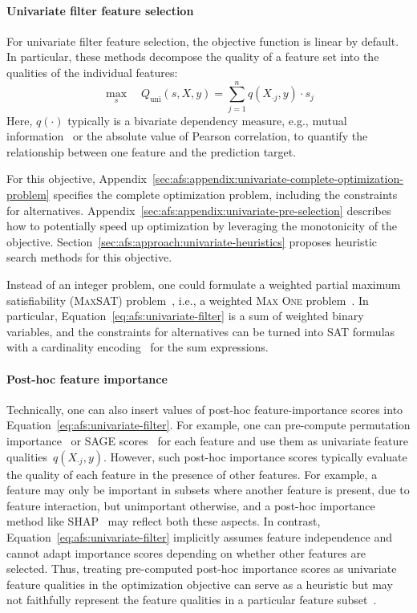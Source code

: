 \documentclass{article}
\theoremstyle{definition}
\begin{document}
\paragraph{Univariate filter feature selection}

For univariate filter feature selection, the objective function is linear by default.
In particular, these methods decompose the quality of a feature set into the qualities of the individual features:
%
\begin{equation}
	\max_s \quad Q_{\text{uni}}(s,X,y) = \sum_{j=1}^{n} q(X_{\cdot{}j},y) \cdot s_j
	\label{eq:afs:univariate-filter}
\end{equation}
%
Here, $q(\cdot)$ typically is a bivariate dependency measure, e.g., mutual information~\cite{kraskov2004estimating} or the absolute value of Pearson correlation, to quantify the relationship between one feature and the prediction target.

For this objective, Appendix~\ref{sec:afs:appendix:univariate-complete-optimization-problem} specifies the complete optimization problem, including the constraints for alternatives.
Appendix~\ref{sec:afs:appendix:univariate-pre-selection} describes how to potentially speed up optimization by leveraging the monotonicity of the objective.
Section~\ref{sec:afs:approach:univariate-heuristics} proposes heuristic search methods for this objective.

Instead of an integer problem, one could formulate a weighted partial maximum satisfiability (\textsc{MaxSAT}) problem~\cite{bacchus2021maximum, li2021maxsat}, i.e., a weighted \textsc{Max One} problem~\cite{khanna1997complete}.
In particular, Equation~\ref{eq:afs:univariate-filter} is a sum of weighted binary variables, and the constraints for alternatives can be turned into SAT formulas with a cardinality encoding~\cite{sinz2005towards} for the sum expressions.

\paragraph{Post-hoc feature importance}

Technically, one can also insert values of post-hoc feature-importance scores into Equation~\ref{eq:afs:univariate-filter}.
For example, one can pre-compute permutation importance~\cite{breiman2001random} or SAGE scores~\cite{covert2020understanding} for each feature and use them as univariate feature qualities~$q(X_{\cdot{}j},y)$.
However, such post-hoc importance scores typically evaluate the quality of each feature in the presence of other features. 
For example, a feature may only be important in subsets where another feature is present, due to feature interaction, but unimportant otherwise, and a post-hoc importance method like SHAP~\cite{lundberg2017unified} may reflect both these aspects.
In contrast, Equation~\ref{eq:afs:univariate-filter} implicitly assumes feature independence and cannot adapt importance scores depending on whether other features are selected.
Thus, treating pre-computed post-hoc importance scores as univariate feature qualities in the optimization objective can serve as a heuristic but may not faithfully represent the feature qualities in a particular feature subset~\cite{fryer2021shapley}.
\end{document}
